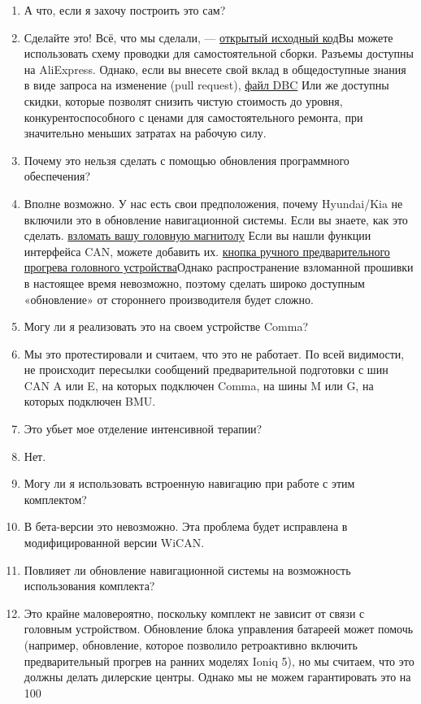 \documentclass[superscriptaddress,onecolumn,floatfix]{revtex4-2}
\begin{document}
\begin{enumerate}
  \item[В:] А что, если я захочу построить это сам?
  \item[А:] Сделайте это! Всё, что мы сделали, — \href{https://github.com/tylerharvey/Ioniq5_CAN}{открытый исходный код}Вы можете использовать схему проводки для самостоятельной сборки. Разъемы доступны на AliExpress. Однако, если вы внесете свой вклад в общедоступные знания в виде запроса на изменение (pull request), \href{https://github.com/dragz/egmpdbc}{файл DBC} Или же доступны скидки, которые позволят снизить чистую стоимость до уровня, конкурентоспособного с ценами для самостоятельного ремонта, при значительно меньших затратах на рабочую силу.
  \item[В:] Почему это нельзя сделать с помощью обновления программного обеспечения?
  \item[А:] Вполне возможно. У нас есть свои предположения, почему Hyundai/Kia не включили это в обновление навигационной системы. Если вы знаете, как это сделать. \href{https://discord.gg/zyrngQ5qQ}{взломать вашу головную магнитолу} Если вы нашли функции интерфейса CAN, можете добавить их. \href{https://www.reddit.com/r/KiaEV6/comments/1jdd56u/comment/mid9xie/}{кнопка ручного предварительного прогрева головного устройства}Однако распространение взломанной прошивки в настоящее время невозможно, поэтому сделать широко доступным «обновление» от стороннего производителя будет сложно.
  \item[В:] Могу ли я реализовать это на своем устройстве Comma?
  \item[А:] Мы это протестировали и считаем, что это не работает. По всей видимости, не происходит пересылки сообщений предварительной подготовки с шин CAN A или E, на которых подключен Comma, на шины M или G, на которых подключен BMU.
  \item[В:] Это убьет мое отделение интенсивной терапии?
  \item[А:] Нет.
  \item[В:] Могу ли я использовать встроенную навигацию при работе с этим комплектом?
  \item[А:] В бета-версии это невозможно. Эта проблема будет исправлена в модифицированной версии WiCAN.
  \item[В:] Повлияет ли обновление навигационной системы на возможность использования комплекта?
  \item[А:] Это крайне маловероятно, поскольку комплект не зависит от связи с головным устройством. Обновление блока управления батареей может помочь (например, обновление, которое позволило ретроактивно включить предварительный прогрев на ранних моделях Ioniq 5), но мы считаем, что это должны делать дилерские центры. Однако мы не можем гарантировать это на 100%

\end{enumerate}
\end{document}

